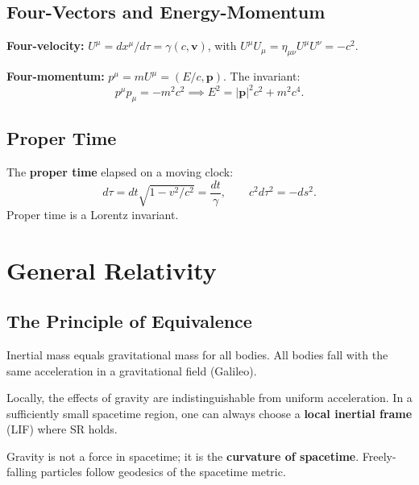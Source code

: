 \documentclass[12pt,a4paper]{article}
\theoremstyle{plain}
\theoremstyle{definition}
\theoremstyle{remark}
\newcommand{\ve}[1]{\mathbf{#1}}           %
\begin{document}
\subsection{Four-Vectors and Energy-Momentum}

\textbf{Four-velocity:} $U^\mu = dx^\mu/d\tau = \gamma(c,\ve{v})$, with $U^\mu U_\mu = \eta_{\mu\nu}U^\mu U^\nu = -c^2$.

\textbf{Four-momentum:} $p^\mu = mU^\mu = (E/c,\ve{p})$. The invariant:
\[
  p^\mu p_\mu = -m^2c^2 \implies E^2 = |\ve{p}|^2c^2 + m^2c^4.
\]

\subsection{Proper Time}

The \textbf{proper time} elapsed on a moving clock:
\[
  d\tau = dt\sqrt{1-v^2/c^2} = \frac{dt}{\gamma},
  \qquad
  c^2d\tau^2 = -ds^2.
\]
Proper time is a Lorentz invariant.

\section{General Relativity}

\subsection{The Principle of Equivalence}

\begin{description}[leftmargin=0pt]
\item[Weak Equivalence Principle (WEP).] Inertial mass equals gravitational mass for all bodies. All bodies fall with the same acceleration in a gravitational field (Galileo).

\item[Einstein's Equivalence Principle (EEP).] Locally, the effects of gravity are indistinguishable from uniform acceleration. In a sufficiently small spacetime region, one can always choose a \textbf{local inertial frame} (LIF) where SR holds.

\item[Physical consequence.] Gravity is not a force in spacetime; it is the \textbf{curvature of spacetime}. Freely-falling particles follow geodesics of the spacetime metric.
\end{description}
\end{document}
